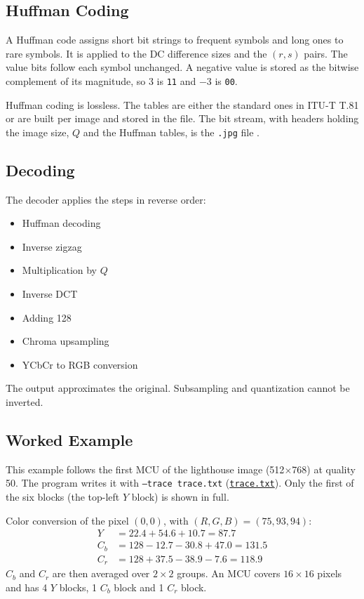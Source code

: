 \documentclass[11pt,a4paper]{article}
\begin{document}
\subsection{Huffman Coding}

A Huffman code assigns short bit strings to frequent symbols and long ones to rare symbols. It is applied to the DC difference sizes and the $(r,s)$ pairs. The value bits follow each symbol unchanged. A negative value is stored as the bitwise complement of its magnitude, so $3$ is \texttt{11} and $-3$ is \texttt{00}.

Huffman coding is lossless. The tables are either the standard ones in ITU-T T.81 \cite{t81} or are built per image and stored in the file. The bit stream, with headers holding the image size, $Q$ and the Huffman tables, is the \texttt{.jpg} file \cite{pennebaker1992}.

\subsection{Decoding}

The decoder applies the steps in reverse order:
\begin{itemize}
\item Huffman decoding
\item Inverse zigzag
\item Multiplication by $Q$
\item Inverse DCT
\item Adding 128
\item Chroma upsampling
\item YCbCr to RGB conversion
\end{itemize}
The output approximates the original. Subsampling and quantization cannot be inverted.

\subsection{Worked Example}

This example follows the first MCU of the lighthouse image (512$\times$768) at quality 50. The program writes it with \texttt{--trace trace.txt} (\href{https://github.com/sahithyandev/labs/tree/main/s5/image-processing/jpeg-compression/trace.txt}{\texttt{trace.txt}}). Only the first of the six blocks (the top-left $Y$ block) is shown in full.

Color conversion of the pixel $(0,0)$, with $(R,G,B)=(75,93,94)$:
\begin{align*}
Y   &= 22.4 + 54.6 + 10.7 = 87.7 \\
C_b &= 128 - 12.7 - 30.8 + 47.0 = 131.5 \\
C_r &= 128 + 37.5 - 38.9 - 7.6 = 118.9
\end{align*}
$C_b$ and $C_r$ are then averaged over $2\times2$ groups. An MCU covers $16\times16$ pixels and has 4 $Y$ blocks, 1 $C_b$ block and 1 $C_r$ block.
\end{document}
